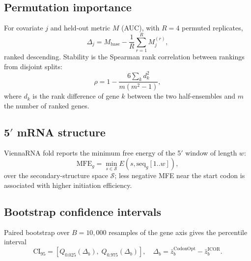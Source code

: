 \subsection{Permutation importance}
For covariate $j$ and held-out metric $M$ (AUC), with $R=4$ permuted replicates,
\begin{equation} \Delta_j = M_{\mathrm{base}} - \frac{1}{R}\sum_{r=1}^{R} M_{j}^{(r)}, \end{equation}
ranked descending. Stability is the Spearman rank correlation between rankings from disjoint splits:
\begin{equation} \rho = 1 - \frac{6 \sum_k d_k^2}{m(m^2-1)}, \end{equation}
where $d_k$ is the rank difference of gene $k$ between the two half-ensembles and $m$ the number of ranked genes.
\subsection{5$'$ mRNA structure}
ViennaRNA fold reports the minimum free energy of the 5$'$ window of length $w$:
\begin{equation} \mathrm{MFE}_g = \min_{s \in \mathcal{S}} E(s, \mathrm{seq}_g[1..w]), \end{equation}
over the secondary-structure space $\mathcal{S}$; less negative MFE near the start codon is associated with higher initiation efficiency.
\subsection{Bootstrap confidence intervals}
Paired bootstrap over $B=10{,}000$ resamples of the gene axis gives the percentile interval
\begin{equation} \mathrm{CI}_{95} = \left[ Q_{0.025}(\Delta_b),\; Q_{0.975}(\Delta_b) \right],\quad \Delta_b = \bar z^{\mathrm{CodonOpt}}_b - \bar z^{\mathrm{ICOR}}_b. \end{equation}
